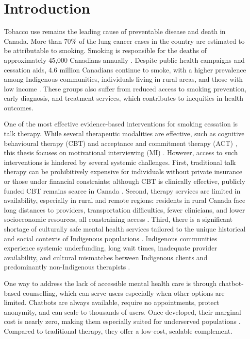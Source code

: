 \chapter{Introduction}

Tobacco use remains the leading cause of preventable disease and death in Canada. More than 70\% of the lung cancer cases in the country are estimated to be attributable to smoking. Smoking is responsible for the deaths of approximately 45,000 Canadians annually \cite{poirier2019estimates}. Despite public health campaigns and cessation aids, 4.6 million Canadians continue to smoke, with a higher prevalence among Indigenous communities, individuals living in rural areas, and those with low income \cite{cpac2020lung}. These groups also suffer from reduced access to smoking prevention, early diagnosis, and treatment services, which contributes to inequities in health outcomes.

One of the most effective evidence-based interventions for smoking cessation is talk therapy. While several therapeutic modalities are effective, such as cognitive behavioural therapy (CBT) \cite{beck2011cognitive} and acceptance and commitment therapy (ACT) \cite{hayes1999acceptance}, this thesis focuses on motivational interviewing (MI) \cite{MillerRollnick2023}. However, access to such interventions is hindered by several systemic challenges. First, traditional talk therapy can be prohibitively expensive for individuals without private insurance or those under financial constraints; although CBT is clinically effective, publicly funded CBT remains scarce in Canada \cite{doi:10.1177/0253717620957496,doi:10.1177/0706743716642416}. Second, therapy services are limited in availability, especially in rural and remote regions: residents in rural Canada face long distances to providers, transportation difficulties, fewer clinicians, and lower socioeconomic resources, all constraining access \cite{burns2007rural,james2021improving}. Third, there is a significant shortage of culturally safe mental health services tailored to the unique historical and social contexts of Indigenous populations \cite{josewski2023improving,hartwasekeesikaw2009cultural}. Indigenous communities experience systemic underfunding, long wait times, inadequate provider availability, and cultural mismatches between Indigenous clients and predominantly non-Indigenous therapists \cite{turner2018poverty}.


One way to address the lack of accessible mental health care is through chatbot-based counselling, which can serve users especially when other options are limited. Chatbots are always available, require no appointments, protect anonymity, and can scale to thousands of users. Once developed, their marginal cost is nearly zero, making them especially suited for underserved populations \cite{torous2017digital,miner2016smartphone}. Compared to traditional therapy, they offer a low-cost, scalable complement.



